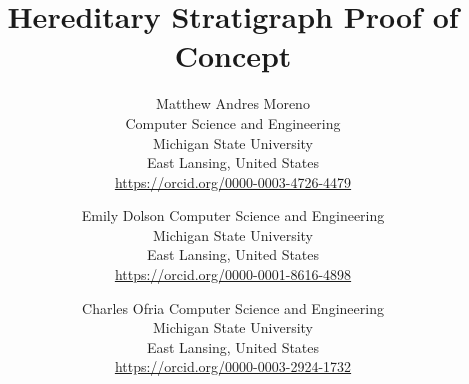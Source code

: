 \title{ Hereditary Stratigraph Proof of Concept }

\author{
Matthew Andres Moreno\\
Computer Science and Engineering \\
Michigan State University\\
East Lansing, United States \\
\url{https://orcid.org/0000-0003-4726-4479} \\
\and
Emily Dolson
Computer Science and Engineering \\
Michigan State University\\
East Lansing, United States \\
\url{https://orcid.org/0000-0001-8616-4898}
\and
Charles Ofria
Computer Science and Engineering \\
Michigan State University\\
East Lansing, United States \\
\url{https://orcid.org/0000-0003-2924-1732}
}

\maketitle
